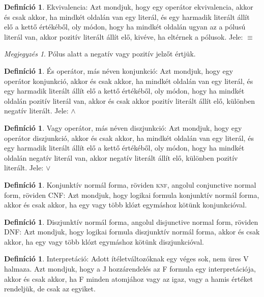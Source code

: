 \documentclass[
]{thesis-ekf}
\theoremstyle{definition}
\newtheorem{definicio}[tetel]{Definíció}
\theoremstyle{remark}
\newtheorem{megjegyzes}[tetel]{Megjegyzés}
\begin{document}
	\begin{definicio}
		Ekvivalencia: Azt mondjuk, hogy egy operátor ekvivalencia, akkor és csak akkor, ha mindkét oldalán van egy literál, és egy harmadik literált állít elő a kettő értékéből, oly módon, hogy ha mindkét oldalán ugyan az a pólusú literál van, akkor pozitív literált állít elő, kivéve, ha eltérnek a pólusok. Jele: $ \equiv $
	\end{definicio}

	\begin{megjegyzes}
		Pólus alatt a negatív vagy pozitív jelzőt értjük.
	\end{megjegyzes}

	\begin{definicio}
		És operátor, más néven konjunkció: Azt mondjuk, hogy egy operátor konjunkció, akkor és csak akkor, ha mindkét oldalán van egy literál, és egy harmadik literált állít elő a kettő értékéből, oly módon, hogy ha mindkét oldalán pozitív literál van, akkor és csak akkor pozitív literált állít elő, különben negatív literált. Jele: $\wedge$
	\end{definicio}

	\begin{definicio}
		Vagy operátor, más néven diszjunkció: Azt mondjuk, hogy egy operátor diszjunkció, akkor és csak akkor, ha mindkét oldalán van egy literál, és egy harmadik literált állít elő a kettő értékéből, oly módon, hogy ha mindkét oldalán negatív literál van, akkor negatív literált állít elő, különben pozitív literált. Jele: $\vee$
	\end{definicio}

	\begin{definicio}\label{def-cnf} %
		Konjunktív normál forma, röviden \textsc{knf}, angolul conjunctive normal form, röviden \textsc{CNF}: Azt mondjuk, hogy logikai formula konjunktív normál forma, akkor és csak akkor, ha egy vagy több klózt egymáshoz kötünk konjunkcióval.
	\end{definicio} %

	\begin{definicio}\label{def-dnf}
		Diszjunktív normál forma, angolul disjunctive normal form, röviden \textsc{DNF}: Azt mondjuk, hogy logikai formula diszjunktív normál forma, akkor és csak akkor, ha egy vagy több klózt egymáshoz kötünk diszjunkcióval.
	\end{definicio}

	\begin{definicio}
		Interpretáció: Adott ítéletváltozóknak egy véges sok, nem üres V halmaza.
		Azt mondjuk, hogy a J hozzárendelés az F formula egy interpretációja, akkor és csak akkor, ha F minden atomjához vagy az igaz, vagy a hamis értéket rendeljük, de csak az egyiket.
	\end{definicio}
\end{document}
